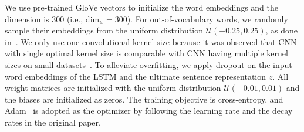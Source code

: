 \documentclass[11pt,a4paper]{article}
\begin{document}
We use pre-trained GloVe vectors \cite{pennington2014glove} to initialize the word embeddings and the dimension is 300 (i.e., $\mathrm{dim}_w=300$). For out-of-vocabulary words, we randomly sample their embeddings from the uniform distribution $\mathcal{U}(-0.25, 0.25)$, as done in~\cite{kim:2014:EMNLP2014}. 
We only use one convolutional kernel size because it was observed that CNN with single optimal kernel size is comparable with CNN having multiple kernel sizes on small datasets~\cite{zhang-wallace:2017:I17-1}. To alleviate overfitting, we apply dropout on the input word embeddings of the LSTM and the ultimate sentence representation $z$. All weight matrices are initialized with the uniform distribution $\mathcal{U}(-0.01, 0.01)$ and the biases are initialized as zeros. The training objective is cross-entropy, and Adam~\cite{kingma2014adam} is adopted as the optimizer by following the learning rate and the decay rates in the original paper. 
\end{document}
